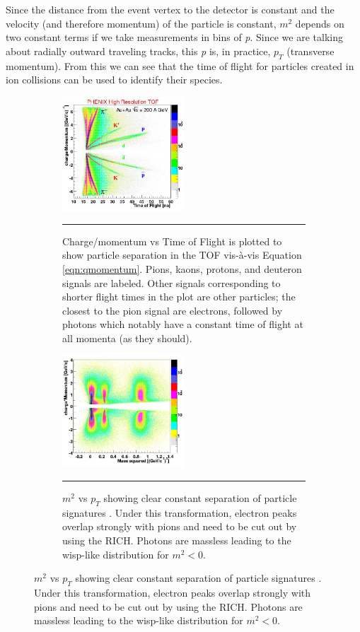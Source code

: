 Since the distance from the event vertex to the detector is constant and the velocity (and therefore momentum) of the particle is constant, $m^{2}$ depends on two constant terms if we take measurements in bins of \textit{p}. Since we are talking about radially outward traveling tracks, this \textit{p} is, in practice, $p_{T}$ (transverse momentum). From this we can see that the time of flight for particles created in ion collisions can be used to identify their species.
\begin{figure}[htbp!]
\begin{subfigure}[H]{1\textwidth}
  \centering
    \includegraphics[width=0.5\textwidth]{Figures/tofchargemom.JPG}
    \rule{35em}{0.5pt}
  \caption[Particle separation in the TOF]{Charge/momentum vs Time of Flight \citep{tofchargemom} is plotted to show particle separation in the TOF vis-\`a-vis Equation \ref{eqn:qmomentum}. Pions, kaons, protons, and deuteron signals are labeled. Other signals corresponding to shorter flight times in the plot are other particles; the closest to the pion signal are electrons, followed by photons which notably have a constant time of flight at all momenta (as they should).}
  \label{fig:tofchargemom}
\end{subfigure}
\begin{subfigure}[H]{1\textwidth}
  \centering
    \includegraphics[width=0.5\textwidth]{Figures/m2tofvspt.jpg}
    \rule{35em}{0.5pt}
  \caption[$m^{2}$ vs $p_{T}$ showing clear constant separation of particle signatures.]{$m^{2}$ vs $p_{T}$ showing clear constant separation of particle signatures \citep{tofchargemom}. Under this transformation, electron peaks overlap strongly with pions and need to be cut out by using the RICH. Photons are massless leading to the wisp-like distribution for $m^2<0$.}
  \label{fig:m2tofvspt}
\end{subfigure}
\end{figure}
\pagebreak
\pagebreak
